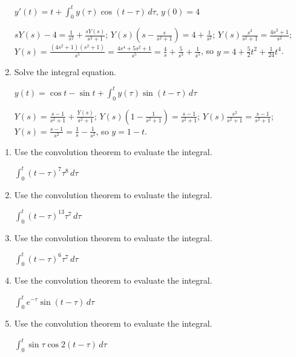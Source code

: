 \documentclass{ximera}
\begin{document}
\begin{problem}
\begin{enumerate}
$y'(t)=t+\int_0^t y(\tau)\cos
(t-\tau)\,d\tau,\, y(0)=4$

\begin{solution}
$sY(s)-4=\frac{1}{s^2}+\frac{sY(s)}{s^2+1}$;
$Y(s)\left(s-\frac{s}{s^2+1}\right)=4+\frac{1}{s^2}$; $Y(s)\frac{s^3}{s^2+1}=\frac{4s^2+1}{s^2}$;
$Y(s)=\frac{(4s^2+1)(s^2+1)}{s^5}=\frac{4s^4+5s^2+1}{s^5}
=\frac{4}{s}+\frac{5}{s^3}+\frac{1}{s^5}$, so
$y=4+\frac{5}{2}t^2+\frac{1}{24}t^4$.
\end{solution}

\item Solve the integral equation.

$y(t)=\cos t-\sin t+
\int_0^t y(\tau)\sin (t-\tau)\,d\tau$

\begin{solution}
$Y(s)=\frac{s-1}{s^2+1}+\frac{Y(s)}{s^2+1}$;
$Y(s)\left(1-\frac{1}{s^2+1}\right)=\frac{s-1}{s^2+1}$; $Y(s)\frac{s^2}{s^2+1}=\frac{s-1}{s^2+1}$; $Y(s)=\frac{s-1}{s^2}
=\frac{1}{s}-\frac{1}{s^2}$, so
 $y=1-t$.
\end{solution}

\end{enumerate}
\end{problem}

\begin{problem}\label{exer:8.6.5}

\begin{enumerate}

\item Use the convolution theorem to evaluate the integral.

$\int_0^t (t-\tau)^7\tau^8\,
d\tau$

\item Use the convolution theorem to evaluate the integral.

$\int_0^t(t-\tau)^{13}\tau^7\,d\tau$

\item Use the convolution theorem to evaluate the integral.

$\int_0^t(t-\tau)^6\tau^7\,
d\tau$

\item Use the convolution theorem to evaluate the integral.

$\int_0^te^{-\tau}\sin(t-\tau)\,d\tau$

\item Use the convolution theorem to evaluate the integral.

 $\int_0^t\sin\tau\cos2(t-\tau)\,d\tau$
\end{enumerate}
\end{problem}
\end{document}

